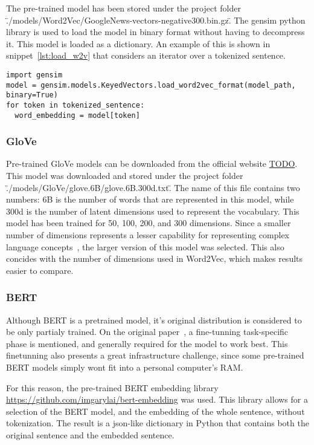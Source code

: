The pre-trained model has been stored under the project folder \"./models/Word2Vec/GoogleNews-vectors-negative300.bin.gz\". The gensim python library is used to load the model in binary format without having to decompress it. This model is loaded as a dictionary. An example of this is shown in snippet~\ref{lst:load_w2v} that considers an iterator over a tokenized sentence.

\begin{lstlisting}[caption={Loading Word2Vec},label=lst:load_w2v,frame=single]
import gensim
model = gensim.models.KeyedVectors.load_word2vec_format(model_path, binary=True)
for token in tokenized_sentence:
  word_embedding = model[token]
\end{lstlisting}

\subsubsection{GloVe}\label{subs:GloVe}
Pre-trained GloVe models can be downloaded from the official website \url{TODO}. This model was downloaded and stored under the project folder \"./models/GloVe/glove.6B/glove.6B.300d.txt\". The name of this file contains two numbers: 6B is the number of words that are represented in this model, while 300d is the number of latent dimensions used to represent the vocabulary. This model has been trained for 50, 100, 200, and 300 dimensions. Since a smaller number of dimensions represents a lesser capability for representing complex language concepts~\cite{TODO}, the larger version of this model was selected. This also concides with the number of dimensions used in Word2Vec, which makes results easier to compare.

\subsubsection{BERT}\label{subs:BERT}
Although BERT is a pretrained model, it's original distribution is considered to be only partialy trained. On the original paper~\cite{TODO}, a fine-tunning task-specific phase is mentioned, and generally required for the model to work best. This fine\-tunning also presents a great infrastructure challenge, since some pre-trained BERT models simply wont fit into a personal computer's RAM.\@

For this reason, the pre-trained BERT embedding library \url{https://github.com/imgarylai/bert-embedding} was used. This library allows for a selection of the BERT model, and the embedding of the whole sentence, without tokenization. The result is a json-like dictionary in Python that contains both the original sentence and the embedded sentence.

